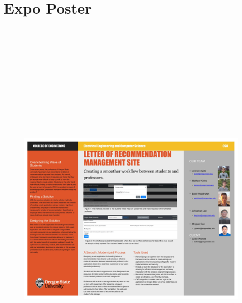 \documentclass[10pt,draftclsnofoot,onecolumn,letterpaper,compsoc]{IEEEtran}
\begin{document}
    \section{Expo Poster}
        \begin{figure}[H]
		    \includegraphics[angle=90,origin=c, width=15cm, height=20cm]{InputDocs/ExpoPoster.jpg}
		    \centering
	    \end{figure}
	\newpage
	
	
	\newpage
	
	
	\newpage
	
	
	\newpage
	
	
	
	
	
	
\end{document}
